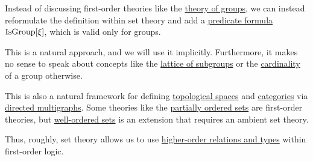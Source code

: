 \begin{remark}\label{rem:first_order_theories_in_zfc}
  Instead of discussing first-order theories like the \hyperref[def:group/theory]{theory of groups}, we can instead reformulate the definition within set theory and add a \hyperref[rem:predicate_formula]{predicate formula} \( \operatorname{IsGroup}[\xi] \), which is valid only for groups.

  This is a natural approach, and we will use it implicitly. Furthermore, it makes no sense to speak about concepts like the \hyperref[thm:substructures_form_complete_lattice]{lattice of subgroups} or the \hyperref[def:cardinal]{cardinality} of a group otherwise.

  This is also a natural framework for defining \hyperref[def:topological_space]{topological spaces} and \hyperref[def:category]{categories} via \hyperref[def:directed_multigraph]{directed multigraphs}. Some theories like the \hyperref[def:partially_ordered_set]{partially ordered sets} are first-order theories, but \hyperref[def:well_ordered_set]{well-ordered sets} is an extension that requires an ambient set theory.

  Thus, roughly, set theory allows us to use \hyperref[rem:higher_order_logic]{higher-order relations and types} within first-order logic.
\end{remark}
